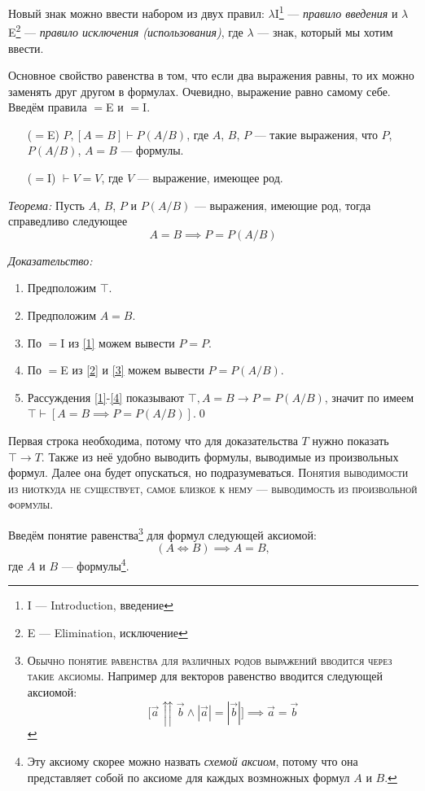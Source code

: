 Новый знак можно ввести набором из двух правил:
$\lambda$I\footnote{I --- Introduction, введение} --- {\it правило введения}
и $\lambda$E\footnote{E --- Elimination, исключение} --- {\it правило
исключения (использования)}, где $\lambda$ --- знак, который мы хотим ввести.

\pagebreak

Основное свойство равенства в том, что если два выражения равны, то их можно
заменять друг другом в формулах. Очевидно, выражение равно самому себе.
Введём правила $=$E	и $=$I.
\begin{enumerate}
	\item[($=$E)]{}$P,[A=B]\vdash P(A/B)$,
	где $A$, $B$, $P$ --- такие выражения, что $P$, $P(A/B)$, $A=B$ --- формулы.
	\item[($=$I)]{}$\vdash V=V$, где $V$ --- выражение, имеющее род.
\end{enumerate}

{\it Теорема:} Пусть $A$, $B$, $P$ и $P(A/B)$ --- выражения, имеющие род,
тогда справедливо следующее
\[
	A=B\implies P=P(A/B)
\]

{\it Доказательство:}
\begin{enumerate}[label=(\arabic*)]
	\item{}\label{1}Предположим $\top$.
	\item{}\label{2}Предположим $A=B$.
	\item{}\label{3}По $=$I из \ref{1} можем вывести $P=P$.
	\item{}\label{4}По $=$E из \ref{2} и \ref{3} можем вывести $P=P(A/B)$.
	\item{}\label{5}Рассуждения \ref{1}-\ref{4} показывают $\top,A=B\to P=P(A/B)$,
	значит по \implic{} имеем $\top\vdash [A=B\implies P=P(A/B)]$.\qed
\end{enumerate}

Первая строка необходима, потому что для доказательства
$T$ нужно показать $\top\to T$. Также из неё удобно выводить формулы,
выводимые из произвольных формул. Далее она будет опускаться,
но подразумеваться.
\textsc{Понятия выводимости из ниоткуда не существует,
	самое близкое к нему --- выводимость из произвольной формулы.}

Введём понятие равенства\footnote{
	\textsc{Обычно понятие равенства для различных родов выражений
		вводится через такие аксиомы.}
	Например для векторов равенство вводится следующей аксиомой:
	\[
		\big[\vec{a}\upuparrows\vec{b}\land|\vec{a}|=|\vec{b}|\big]
		\implies \vec{a}=\vec{b}
	\]
} для формул следующей аксиомой:
\[
	(A\iff B)\implies A=B,
\]
где $A$ и $B$ --- формулы\footnote{
Эту аксиому скорее можно назвать {\it схемой аксиом}, потому что она представляет
собой по аксиоме для каждых возмножных формул $A$ и $B$.
}.

